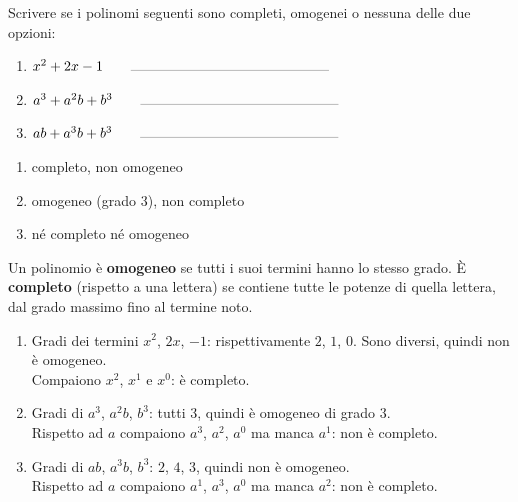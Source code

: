 \begin{question}[ID=0.1, subtitle={Classificazione di polinomi: completo e omogeneo}, tags={prodotti, polinomi}, difficulty=facile]
Scrivere se i polinomi seguenti sono completi, omogenei o nessuna delle due opzioni:
\begin{center}\begin{minipage}{0.85\linewidth}
\begin{enumerate}
\item $x^2 + 2x - 1 \qquad \rule{5cm}{0.2pt}$
\item $a^3 + a^2 b + b^3 \qquad \rule{5cm}{0.2pt}$
\item $ab + a^3 b + b^3 \qquad \rule{5cm}{0.2pt}$
\end{enumerate}
\end{minipage}\end{center}
\begin{solution}
\begin{enumerate}
    \item completo, non omogeneo
    \item omogeneo (grado $3$), non completo
    \item né completo né omogeneo
\end{enumerate}
\end{solution}
\begin{explanation}
Un polinomio è \textbf{omogeneo} se tutti i suoi termini hanno lo stesso grado. È \textbf{completo} (rispetto a una lettera) se contiene tutte le potenze di quella lettera, dal grado massimo fino al termine noto.
\begin{enumerate}
    \item Gradi dei termini $x^2$, $2x$, $-1$: rispettivamente $2$, $1$, $0$. Sono diversi, quindi non è omogeneo. \\
    Compaiono $x^2$, $x^1$ e $x^0$: è completo.
    \item Gradi di $a^3$, $a^2b$, $b^3$: tutti $3$, quindi è omogeneo di grado $3$. \\
    Rispetto ad $a$ compaiono $a^3$, $a^2$, $a^0$ ma manca $a^1$: non è completo.
    \item Gradi di $ab$, $a^3b$, $b^3$: $2$, $4$, $3$, quindi non è omogeneo. \\
    Rispetto ad $a$ compaiono $a^1$, $a^3$, $a^0$ ma manca $a^2$: non è completo.
\end{enumerate}
\end{explanation}
\end{question}

